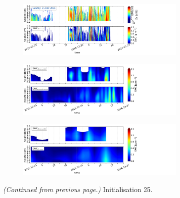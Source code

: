 \begin{figure}[t]\ContinuedFloat
	\centering
	\begin{subfigure}[t]{\textwidth}
		\centering
		\includegraphics[trim={0.cm 2.2cm 19.cm 0.5cm},clip,width=0.9\textwidth]{./fig_obs_ret/20161225}
		\caption{}\label{fig:SWC:ret_25}
	\end{subfigure}
	\begin{subfigure}[t]{\textwidth}
		\centering
		\includegraphics[trim={0.cm 2.2cm 19.cm 0.5cm},clip,width=0.9\textwidth]{./fig_vert_SWC_EM/20161225}
		\caption{}\label{fig:SWC_EM:25}
	\end{subfigure}
	\begin{subfigure}[t]{\textwidth}
		\centering
		\includegraphics[trim={0.cm 0.8cm 19.cm 0.5cm},clip,width=0.9\textwidth]{./fig_vert_SWC_3h/20161225}
		\caption{}\label{fig:SWC3h:25}
	\end{subfigure}
	\caption{\textit{(Continued from previous page.)} Initialisation \SI{25}{\dec}.}
\end{figure}
\noindent
